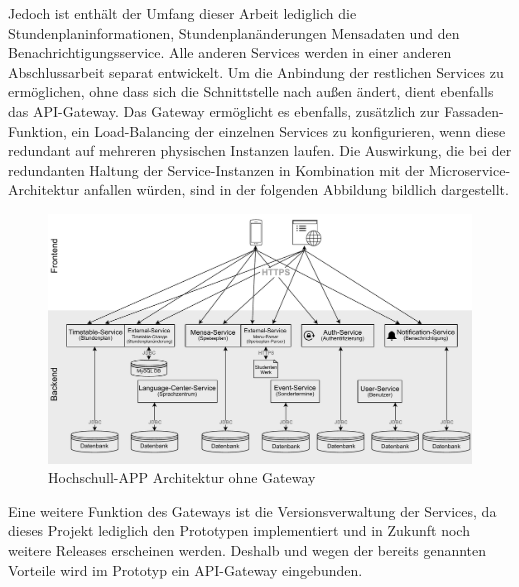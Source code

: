 Jedoch ist enthält der Umfang dieser Arbeit lediglich die Stundenplaninformationen, Stundenplanänderungen Mensadaten und den Benachrichtigungsservice. Alle anderen Services werden in einer anderen Abschlussarbeit separat entwickelt. Um die Anbindung der restlichen Services zu ermöglichen, ohne dass sich die Schnittstelle nach außen ändert, dient ebenfalls das \ac{API}-Gateway. Das Gateway ermöglicht es ebenfalls, zusätzlich zur Fassaden-Funktion, ein Load-Balancing der einzelnen Services zu konfigurieren, wenn diese redundant auf mehreren physischen Instanzen laufen. Die Auswirkung, die bei der redundanten Haltung der Service-Instanzen in Kombination mit der Microservice-Architektur anfallen würden, sind in der folgenden Abbildung bildlich dargestellt.

\begin{figure}[H]
\centering
\includegraphics[width=\pictureWidth cm + 2cm]{Bilder/Kapitel_3/app_architektur_no_proxy.pdf}
\caption{Hochschull-APP Architektur ohne Gateway\label{fig:architekturnoproxy}}
\end{figure}

Eine weitere Funktion des Gateways ist die Versionsverwaltung der Services, da dieses Projekt lediglich den Prototypen implementiert und in Zukunft noch weitere Releases erscheinen werden. Deshalb und wegen der bereits genannten Vorteile wird im Prototyp ein \ac{API}-Gateway eingebunden.

